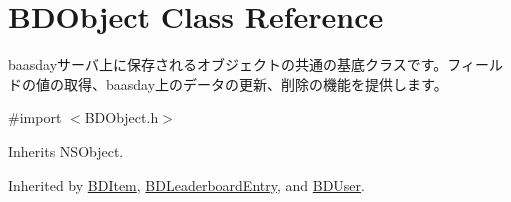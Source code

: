\hypertarget{interface_b_d_object}{\section{B\-D\-Object Class Reference}
\label{interface_b_d_object}
}


baasdayサーバ上に保存されるオブジェクトの共通の基底クラスです。フィールドの値の取得、baasday上のデータの更新、削除の機能を提供します。  




{\ttfamily \#import $<$B\-D\-Object.\-h$>$}



Inherits N\-S\-Object.



Inherited by \hyperlink{interface_b_d_item}{B\-D\-Item}, \hyperlink{interface_b_d_leaderboard_entry}{B\-D\-Leaderboard\-Entry}, and \hyperlink{interface_b_d_user}{B\-D\-User}.

